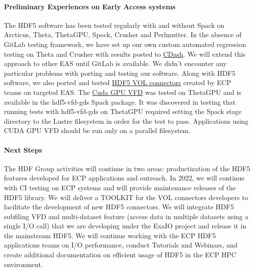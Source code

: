 \paragraph{Preliminary Experiences on Early Access systems}
The HDF5 software has been tested regularly with and without Spack on Arcticus, Theta, ThetaGPU, Spock, Crusher and Perlmutter.  In the absence of GitLab testing framework, we have set up our own custom automated regression testing on Theta and Crusher with results posted to \href{https://cdash.hdfgroup.org}{CDash}.  We will extend this approach to other EAS until GitLab is available.  We didn't encounter any particular problems with porting and testing our software.  Along with HDF5 software, we also ported and tested \href{https://portal.hdfgroup.org/display/support/Registered+VOL+Connectors}{HDF5 VOL connectors} created by ECP teams on targeted EAS.  The \href{https://portal.hdfgroup.org/pages/viewpage.action?pageId=74188097}{Cuda GPU VFD} was tested on ThetaGPU and is available in the hdf5-vfd-gds Spack package.  It was discovered in testing that running tests with hdf5-vfd-gds on ThetaGPU required setting the Spack stage directory to the Lustre filesystem in order for the test to pass.  Applications using CUDA GPU VFD should be run only on a parallel filesystem. 

\paragraph{Next Steps}
The HDF Group activities will continue in two areas:  productization of the HDF5 features developed for ECP applications and outreach. In 2022, we will continue with CI testing on ECP systems and will provide maintenance releases of the HDF5 library.  We will deliver a TOOLKIT for the VOL connectors developers to facilitate the development of new HDF5 connectors. We will integrate HDF5 subfiling VFD and multi-dataset feature (access data in multiple datasets using a single I/O call) that we are developing under the ExaIO project and release it in the mainstream HDF5. We will continue working with the ECP HDF5 applications teams on I/O performance, conduct Tutorials and Webinars, and create additional documentation on efficient usage of HDF5 in the ECP HPC environment. 
